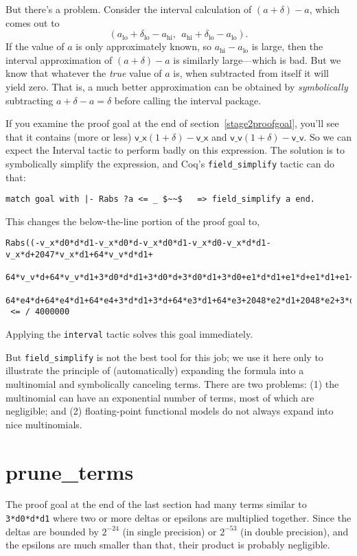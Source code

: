 \documentclass[article]{memoir}
\begin{document}
But there's a problem.  Consider the interval calculation of
$(a+\delta)-a$, which comes out to
\[(a_\mathrm{lo}+\delta_\mathrm{lo}-a_\mathrm{hi},~~a_\mathrm{hi}+\delta_\mathrm{lo}-a_\mathrm{lo}).\]
If the value of $a$ is only approximately known, so
$a_\mathrm{hi}-a_\mathrm{lo}$ is large, then the interval approximation
of $(a+\delta)-a$ is similarly large---which is bad.  But we know that whatever the \emph{true} value of $a$ is, when subtracted from itself it will yield zero.
That is, a much better approximation can be obtained by
\emph{symbolically} subtracting $a+\delta-a=\delta$
before calling the interval package.

If you examine the proof goal at the end of section~\ref{stage2proofgoal},
you'll see that it contains (more or less)
$\mathsf{v\_x}(1+\delta)-\mathsf{v\_x}$ and
$\mathsf{v\_v}(1+\delta)-\mathsf{v\_v}$.  So we can expect the Interval
tactic to perform badly on this expression.
The solution is to symbolically simplify the expression,
and Coq's \lstinline{field_simplify} tactic can do that:

\begin{lstlisting}
match goal with |- Rabs ?a <= _ $~~$   => field_simplify a end.
\end{lstlisting}
This changes the below-the-line portion of the proof goal to,
\begin{lstlisting}
Rabs((-v_x*d0*d*d1-v_x*d0*d-v_x*d0*d1-v_x*d0-v_x*d*d1-v_x*d+2047*v_x*d1+64*v_v*d*d1+
   64*v_v*d+64*v_v*d1+3*d0*d*d1+3*d0*d+3*d0*d1+3*d0+e1*d*d1+e1*d+e1*d1+e1+64*e4*d*d1+
   64*e4*d+64*e4*d1+64*e4+3*d*d1+3*d+64*e3*d1+64*e3+2048*e2*d1+2048*e2+3*d1+2048*e0)/2048)
 <= / 4000000
\end{lstlisting}
Applying the \lstinline{interval} tactic solves this goal immediately.

But \lstinline{field_simplify} is not the best tool for this job;
we use it here only to illustrate the principle of (automatically) expanding the
formula into a multinomial and symbolically canceling terms.
There are two problems: (1) the multinomial can have an exponential number of terms, most of which are negligible; and (2) floating-point functional models do not always expand into nice multinomials.

\chapter{prune\_terms}

The proof goal at the end of the last section had many terms
similar to \lstinline{3*d0*d*d1} where two or more deltas or epsilons
are multiplied together.  Since the deltas are bounded by $2^{-24}$
(in single precision) or $2^{-53}$ (in double precision),
and the epsilons are much smaller than that, their product is
probably negligible.
\end{document}
